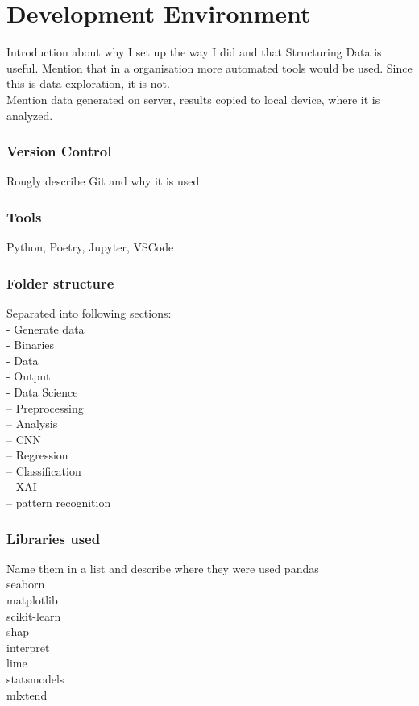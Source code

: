 \chapter{Development Environment}\label{chapter:environment}
Introduction about why I set up the way I did and that Structuring Data is useful. Mention that in a organisation more automated tools would be used. Since this is data exploration, it is not. \\
Mention data generated on server, results copied to local device, where it is analyzed. \\

\subsection{Version Control}
Rougly describe Git and why it is used
\subsection{Tools}
Python, Poetry, Jupyter, VSCode

\subsection{Folder structure}
Separated into following sections:\\
- Generate data\\
- Binaries\\
- Data\\
- Output\\
- Data Science\\
-- Preprocessing\\
-- Analysis\\
-- CNN\\
-- Regression\\
-- Classification\\ 
-- XAI\\
-- pattern recognition\\


\subsection{Libraries used}
Name them in a list and describe where they were used
pandas\\
seaborn \\
matplotlib\\ 
scikit-learn\\
shap \\
interpret\\ 
lime \\
statsmodels \\ 
mlxtend \\
